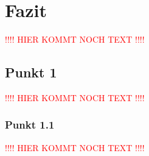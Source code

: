 \chapter{Fazit}
\label{sec:Fazit}

\textcolor{red}{!!!! HIER KOMMT NOCH TEXT !!!!}

\section{Punkt 1}

\textcolor{red}{!!!! HIER KOMMT NOCH TEXT !!!!}


\subsection{Punkt 1.1}

\textcolor{red}{!!!! HIER KOMMT NOCH TEXT !!!!}